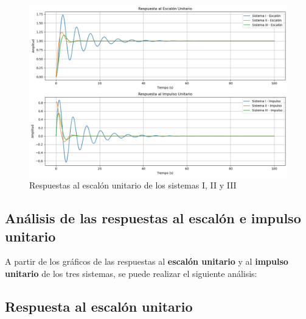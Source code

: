 \documentclass[10pt]{article}
\theoremstyle{definition}
\theoremstyle{remark}
\theoremstyle{definition}
\numberwithin{equation}{prob}
\begin{document}
\begin{figure}[h]
	\centering
	\includegraphics[width=1\textwidth]{./figures/Figura 10 ejercicio 7.png}
	\caption{Respuestas al escalón unitario de los sistemas I, II y III}
\end{figure}

\newpage

\subsection{Análisis de las respuestas al escalón e impulso unitario}

A partir de los gráficos de las respuestas al \textbf{escalón unitario} y al \textbf{impulso unitario} de los tres sistemas, se puede realizar el siguiente análisis:

\subsection{Respuesta al escalón unitario}
\end{document}
